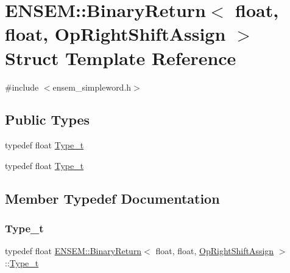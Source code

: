 \hypertarget{structENSEM_1_1BinaryReturn_3_01float_00_01float_00_01OpRightShiftAssign_01_4}{}\section{E\+N\+S\+EM\+:\+:Binary\+Return$<$ float, float, Op\+Right\+Shift\+Assign $>$ Struct Template Reference}
\label{structENSEM_1_1BinaryReturn_3_01float_00_01float_00_01OpRightShiftAssign_01_4}


{\ttfamily \#include $<$ensem\+\_\+simpleword.\+h$>$}

\subsection*{Public Types}
\begin{DoxyCompactItemize}
\item 
typedef float \mbox{\hyperlink{structENSEM_1_1BinaryReturn_3_01float_00_01float_00_01OpRightShiftAssign_01_4_a79bb667fa95c821edd1a65ad18229767}{Type\+\_\+t}}
\item 
typedef float \mbox{\hyperlink{structENSEM_1_1BinaryReturn_3_01float_00_01float_00_01OpRightShiftAssign_01_4_a79bb667fa95c821edd1a65ad18229767}{Type\+\_\+t}}
\end{DoxyCompactItemize}


\subsection{Member Typedef Documentation}
\mbox{\label{structENSEM_1_1BinaryReturn_3_01float_00_01float_00_01OpRightShiftAssign_01_4_a79bb667fa95c821edd1a65ad18229767}} 
\subsubsection{\texorpdfstring{Type\_t}{Type\_t}\hspace{0.1cm}{\footnotesize\ttfamily [1/2]}}
{\footnotesize\ttfamily typedef float \mbox{\hyperlink{structENSEM_1_1BinaryReturn}{E\+N\+S\+E\+M\+::\+Binary\+Return}}$<$ float, float, \mbox{\hyperlink{structENSEM_1_1OpRightShiftAssign}{Op\+Right\+Shift\+Assign}} $>$\+::\mbox{\hyperlink{structENSEM_1_1BinaryReturn_3_01float_00_01float_00_01OpRightShiftAssign_01_4_a79bb667fa95c821edd1a65ad18229767}{Type\+\_\+t}}}

